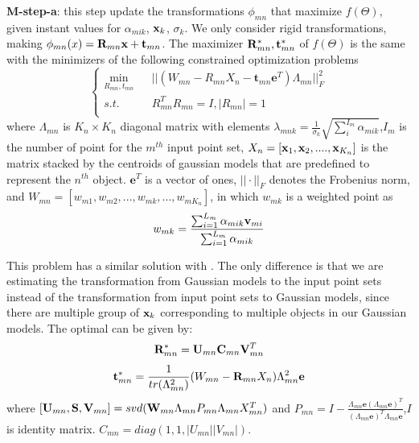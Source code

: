 \textbf{M-step-a}: this step update the transformations $\phi_{mn}$ that maximize $f(\Theta)$, given instant values for $\alpha_{mik}$, $\mathbf{x}_k$, $\sigma_k$. 
%
We only consider rigid transformations, making  $\phi_{mn}(x)=\mathbf{R}_{mn}\mathbf{x}+\mathbf{t}_{mn}$. The maximizer $\mathbf{R}_{mn}^*,\mathbf{t}_{mn}^*$ of $f(\Theta)$ is the same with the minimizers of the following constrained optimization problems
%
\begin{equation}
\left\{
\begin{array}{rcl}
\min_{R_{mn},t_{mn}}&      &||(W_{mn}-R_{mn}X_n-\pmb t_{mn}\mathbf{e}^T)\Lambda_{mn}||_F^2\\
s.t.&      &R_{mn}^TR_{mn}=I, |R_{mn}|=1\\
\end{array} \right.
\end{equation}
where $\Lambda_{mn}$ is $K_n \times K_n$ diagonal matrix with elements $\lambda_{mnk}=\frac{1}{\sigma_k}\sqrt{\sum_i^{I_{m}}\alpha_{mik}}$,$I_m$ is the number of point for the $m^{th}$ input point set, $X_n = [\mathbf{x}_1, \mathbf{x}_2,...., \mathbf{x}_{K_n}]$ is the matrix stacked by the centroids of gaussian models that are predefined to represent the $n^{th}$ object. $\mathbf{e}^T$ is a vector of ones, $||\cdot||_F$ denotes the Frobenius norm, and $W_{mn}=[w_{m1},w_{m2},...,w_{mk},...,w_{mK_n}]$, in which $w_{mk}$ is a weighted point as
%
\begin{equation}
w_{mk}=\frac{\sum_{i=1}^{L_m}\alpha_{mik} \mathbf{v}_{mi}}{\sum_{i=1}^{L_m}\alpha_{mik}}
\end{equation}




This problem has a similar solution with \cite{Evangelidis2014}. 
The only difference is that we are estimating the transformation from Gaussian models to the input point sets instead of the transformation from input point sets to Gaussian models, since there are multiple group of $\mathbf{x}_k$ corresponding to multiple objects in our Gaussian models. The optimal can be given by:
%
\begin{equation}
\label{equ:updateR}
\mathbf{R}_{mn}^*=\mathbf{U}_{mn}\mathbf{C}_{mn}\mathbf{V}_{mn}^T
\end{equation}
\begin{equation}
\label{equ:updatet}
\mathbf{t}_{mn}^*=\frac{1}{tr(\Lambda_{mn}^2)}(W_{mn}-\mathbf{R}_{mn}X_n)\Lambda_{mn}^2\mathbf{e}
\end{equation}
where $[\mathbf{U}_{mn},\mathbf{S},\mathbf{V}_{mn}]=svd( \mathbf{W}_{mn}\Lambda_{mn}P_{mn}\Lambda_{mn}X_{mn}^T )$ and $P_{mn}=I-\frac{\Lambda_{mn}\mathbf{e}(\Lambda_{mn}\mathbf{e})^T}{(\Lambda_{mn}\mathbf{e})^T\Lambda_{mn}\mathbf{e}}$,$I$ is identity matrix. $C_{mn}=diag(1,1,|U_{mn}||V_{mn}|)$.

